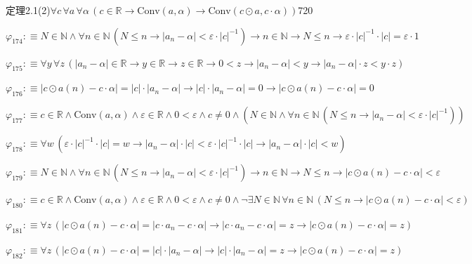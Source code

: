 \begin{fullproof}{定理2.1(2)}{$\forall c\,\forall a\,\forall \alpha\,(c \in \mathbb{R} \to \mathrm{Conv}(a,\alpha) \to \mathrm{Conv}(c \odot a,c \cdot \alpha))$}{720}
\begin{abbrevlist}
\item $\varphi_{174} :\equiv N \in \mathbb{N} \land \forall n \in \mathbb{N}\,(N \leq n \to \lvert a_{n} - \alpha \rvert < \varepsilon \cdot \lvert c \rvert^{-1}) \to n \in \mathbb{N} \to N \leq n \to \varepsilon \cdot \lvert c \rvert^{-1} \cdot \lvert c \rvert = \varepsilon \cdot 1$
\item $\varphi_{175} :\equiv \forall y\,\forall z\,(\lvert a_{n} - \alpha \rvert \in \mathbb{R} \to y \in \mathbb{R} \to z \in \mathbb{R} \to 0 < z \to \lvert a_{n} - \alpha \rvert < y \to \lvert a_{n} - \alpha \rvert \cdot z < y \cdot z)$
\item $\varphi_{176} :\equiv \lvert c \odot a(n) - c \cdot \alpha \rvert = \lvert c \rvert \cdot \lvert a_{n} - \alpha \rvert \to \lvert c \rvert \cdot \lvert a_{n} - \alpha \rvert = 0 \to \lvert c \odot a(n) - c \cdot \alpha \rvert = 0$
\item $\varphi_{177} :\equiv c \in \mathbb{R} \land \mathrm{Conv}(a,\alpha) \land \varepsilon \in \mathbb{R} \land 0 < \varepsilon \land c \neq 0 \land (N \in \mathbb{N} \land \forall n \in \mathbb{N}\,(N \leq n \to \lvert a_{n} - \alpha \rvert < \varepsilon \cdot \lvert c \rvert^{-1}))$
\item $\varphi_{178} :\equiv \forall w\,(\varepsilon \cdot \lvert c \rvert^{-1} \cdot \lvert c \rvert = w \to \lvert a_{n} - \alpha \rvert \cdot \lvert c \rvert < \varepsilon \cdot \lvert c \rvert^{-1} \cdot \lvert c \rvert \to \lvert a_{n} - \alpha \rvert \cdot \lvert c \rvert < w)$
\item $\varphi_{179} :\equiv N \in \mathbb{N} \land \forall n \in \mathbb{N}\,(N \leq n \to \lvert a_{n} - \alpha \rvert < \varepsilon \cdot \lvert c \rvert^{-1}) \to n \in \mathbb{N} \to N \leq n \to \lvert c \odot a(n) - c \cdot \alpha \rvert < \varepsilon$
\item $\varphi_{180} :\equiv c \in \mathbb{R} \land \mathrm{Conv}(a,\alpha) \land \varepsilon \in \mathbb{R} \land 0 < \varepsilon \land c \neq 0 \land \neg \exists N \in \mathbb{N}\,\forall n \in \mathbb{N}\,(N \leq n \to \lvert c \odot a(n) - c \cdot \alpha \rvert < \varepsilon)$
\item $\varphi_{181} :\equiv \forall z\,(\lvert c \odot a(n) - c \cdot \alpha \rvert = \lvert c \cdot a_{n} - c \cdot \alpha \rvert \to \lvert c \cdot a_{n} - c \cdot \alpha \rvert = z \to \lvert c \odot a(n) - c \cdot \alpha \rvert = z)$
\item $\varphi_{182} :\equiv \forall z\,(\lvert c \odot a(n) - c \cdot \alpha \rvert = \lvert c \rvert \cdot \lvert a_{n} - \alpha \rvert \to \lvert c \rvert \cdot \lvert a_{n} - \alpha \rvert = z \to \lvert c \odot a(n) - c \cdot \alpha \rvert = z)$

\end{abbrevlist}
\end{fullproof}
